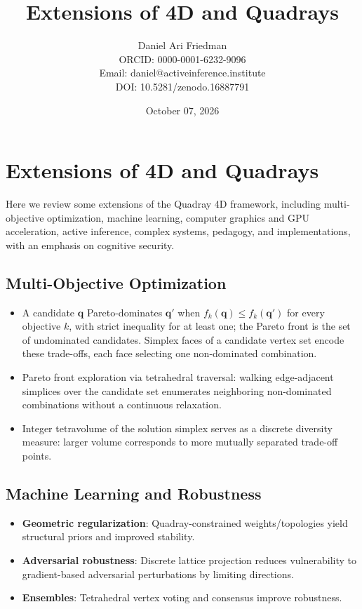 \documentclass[
  10pt,
]{article}
\title{Extensions of 4D and Quadrays}
\author{Daniel Ari Friedman\\ ORCID: 0000-0001-6232-9096\\ Email: daniel@activeinference.institute\\ DOI: 10.5281/zenodo.16887791}
\date{October 07, 2026}
\providecommand{\tightlist}{%
  \setlength{\itemsep}{0pt}\setlength{\parskip}{0pt}}
\begin{document}
\maketitle

{
\hypersetup{linkcolor=black}
\setcounter{tocdepth}{3}
\tableofcontents
}
\section{Extensions of 4D and
Quadrays}\label{extensions-of-4d-and-quadrays}

Here we review some extensions of the Quadray 4D framework, including
multi-objective optimization, machine learning, computer graphics and
GPU acceleration, active inference, complex systems, pedagogy, and
implementations, with an emphasis on cognitive security.

\subsection{Multi-Objective
Optimization}\label{multi-objective-optimization}

\begin{itemize}
\tightlist
\item
  A candidate \(\mathbf{q}\) Pareto-dominates \(\mathbf{q}'\) when
  \(f_k(\mathbf{q}) \le f_k(\mathbf{q}')\) for every objective \(k\),
  with strict inequality for at least one; the Pareto front is the set
  of undominated candidates. Simplex faces of a candidate vertex set
  encode these trade-offs, each face selecting one non-dominated
  combination.
\item
  Pareto front exploration via tetrahedral traversal: walking
  edge-adjacent simplices over the candidate set enumerates neighboring
  non-dominated combinations without a continuous relaxation.
\item
  Integer tetravolume of the solution simplex serves as a discrete
  diversity measure: larger volume corresponds to more mutually
  separated trade-off points.
\end{itemize}

\subsection{Machine Learning and
Robustness}\label{machine-learning-and-robustness}

\begin{itemize}
\tightlist
\item
  \textbf{Geometric regularization}: Quadray-constrained
  weights/topologies yield structural priors and improved stability.
\item
  \textbf{Adversarial robustness}: Discrete lattice projection reduces
  vulnerability to gradient-based adversarial perturbations by limiting
  directions.
\item
  \textbf{Ensembles}: Tetrahedral vertex voting and consensus improve
  robustness.
\end{itemize}
\end{document}
